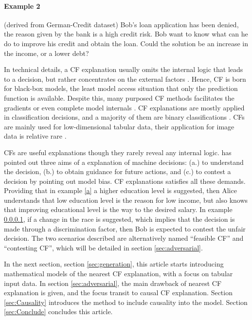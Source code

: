 \paragraph{Example 2} \label{b}(derived from German-Credit dataset) Bob's loan application has been denied, the reason given by the bank is a high credit risk. Bob want to know what can he do to improve his credit and obtain the loan. Could the solution be an increase in the income, or a lower debt?

In technical details, a CF explanation usually omits the internal logic that leads to a decision, but rather concentrates on the external factors \cite{watcher2017}. Hence, CF is born for black-box models, the least model access situation that only the prediction function is available. Despite this, many purposed CF methods facilitates the gradients or even complete model internals \cite{CFReview}. CF explanations are mostly applied in classification decisions, and a majority of them are binary classifications \cite{CFandAE}. CFs are mainly used for low-dimensional tabular data, their application for image data is relative rare \cite{CFandAE}.

 CFs are useful explanations though they rarely reveal any internal logic. \citeauthor{watcher2017} \cite{watcher2017} has pointed out three aims of a explanation of machine decisions: (a.) to understand the decision, (b.) to obtain guidance for future actions, and (c.) to contest a decision by pointing out model bias. CF explanations satisfies all these demands. Providing that in example \ref{a} a higher education level is suggested, then Alice understands that low education level is the reason for low income, but also knows that improving educational level is the way to the desired salary. In example \ref{b}, if a change in the race is suggested, which implies that the decision is made through a discrimination factor, then Bob is expected to contest the unfair decision. The two scenarios described are alternatively named ``feasible CF'' and ``contesting CF'', which will be detailed in section \ref{sec:adversarial}.

In the next section, section \ref{sec:generation}, this article starts introducing mathematical models of the nearest CF explanation, with a focus on tabular input data. In section \ref{sec:adversarial}, the main drawback of nearest CF explanation is given, and the focus transit to causal CF explanation. Section \ref{sec:Causality} introduces the method to include causality into the model. Section \ref{sec:Conclude} concludes this article.

